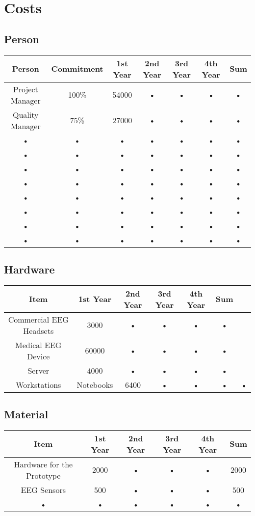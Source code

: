 \section{Costs}
\label{sect:costs}
\subsection{Person}
\begin{tabular}{|c|c|c|c|c|c|c|}
\hline 
Person & Commitment & 1st Year & 2nd Year & 3rd Year & 4th Year & Sum \\ 
\hline 
Project Manager & 100\% & 54000 & • & • & • & • \\ 
\hline 
Quality Manager & 75\% & 27000 & • & • & • & • \\ 
\hline 
• & • & • & • & • & • & • \\ 
\hline 
• & • & • & • & • & • & • \\ 
\hline 
• & • & • & • & • & • & • \\ 
\hline 
• & • & • & • & • & • & • \\ 
\hline 
• & • & • & • & • & • & • \\ 
\hline 
• & • & • & • & • & • & • \\ 
\hline 
• & • & • & • & • & • & • \\ 
\hline 
• & • & • & • & • & • & • \\ 
\hline 
\end{tabular} 

\subsection{Hardware}
\begin{tabular}{|c|c|c|c|c|c|}
\hline 
Item & 1st Year & 2nd Year & 3rd Year & 4th Year & Sum \\ 
\hline 
Commercial EEG Headsets & 3000 & • & • & • & • \\ 
\hline 
Medical EEG Device & 60000 & • & • & • & • \\ 
\hline 
Server & 4000 & • & • & • & • \\ 
\hline 
Workstations & Notebooks & 6400 & • & • & • & • \\ 
\hline 
\end{tabular}
\subsection{Material}
\begin{tabular}{|c|c|c|c|c|c|}
\hline 
Item & 1st Year & 2nd Year & 3rd Year & 4th Year & Sum \\ 
\hline 
Hardware for the Prototype & 2000 & • & • & • & 2000 \\ 
\hline 
EEG Sensors & 500 & • & • & • & 500 \\ 
\hline 
• & • & • & • & • & • \\ 
\hline 
\end{tabular} 
